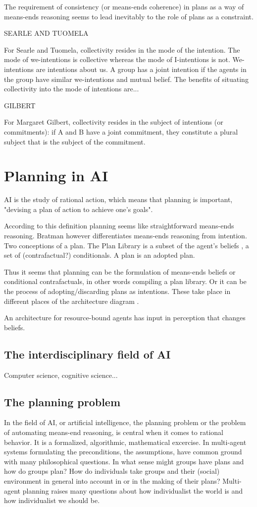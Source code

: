 The requirement of consistency (or means-ends coherence) in plans as a way of means-ends reasoning seems to lead inevitably to the role of plans as a constraint.

SEARLE AND TUOMELA

For Searle and Tuomela, collectivity resides in the mode of the intention. The mode of we-intentions is collective whereas the mode of I-intentions is not. We-intentions are intentions about us. A group has a joint intention if the agents in the group have similar we-intentions and mutual belief. The benefits of situating collectivity into the mode of intentions are...

GILBERT

For Margaret Gilbert, collectivity resides in the subject of intentions (or commitments): if A and B have a joint commitment, they constitute a plural subject that is the subject of the commitment.

\section{Planning in AI}

AI is the study of rational action, which means that planning is important, "devising a plan of action to achieve one's goals".

According to this definition planning seems like straightforward means-ends reasoning. Bratman however differentiates means-ends reasoning from intention. Two conceptions of a plan. The Plan Library is a subset of the agent's beliefs \citep[p.~7]{bratman_plans_1988}, a set of (contrafactual?) conditionals. A plan is an adopted plan.

Thus it seems that planning can be the formulation of means-ends beliefs or conditional contrafactuals, in other words compiling a plan library. Or it can be the process of adopting/discarding plans as intentions. These take place in different places of the architecture diagram \citep[p.~7]{bratman_plans_1988}.

An architecture for resource-bound agents \citep[p.~7]{bratman_plans_1988} has input in perception that changes beliefs.

\subsection{The interdisciplinary field of AI}
Computer science, cognitive science...
\subsection{The planning problem}
In the field of AI, or artificial intelligence, the planning problem or the problem of automating means-end reasoning, is central when it comes to rational behavior. It is a formalized, algorithmic, mathematical excercise. In multi-agent systems formulating the preconditions, the assumptions, have common ground with many philosophical questions. In what sense might groups have plans and how do groups plan? How do individuals take groups and their (social) environment in general into account in or in the making of their plans? Multi-agent planning raises many questions about how individualist the world is and how individualist we should be.

